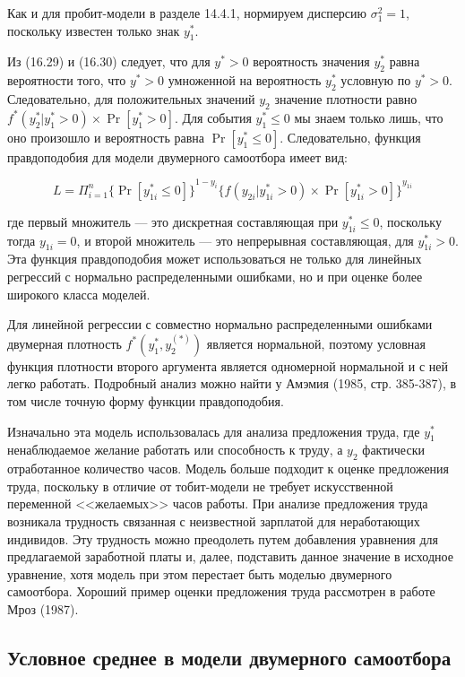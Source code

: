 Как и для пробит-модели в разделе 14.4.1, нормируем дисперсию $\sigma^{2}_1=1$, поскольку известен только знак $y^* _1$. 

Из (16.29) и (16.30) следует, что для  $y^* >0$ вероятность значения $y^* _2$ равна вероятности того, что $y^* >0$ умноженной на вероятность $y^* _2$ условную по $y^* >0$. Следовательно, для положительных значений $y_2$ значение плотности равно $f^{*}(y^* _2|y^* _1>0){\times}\Pr[ y^* _1>0]$. Для события $y^* _{1} \leq 0$ мы знаем только лишь, что оно произошло и вероятность равна $\Pr[ y_{1}^{*} \leq 0]$. Следовательно, функция правдоподобия для модели двумерного самоотбора имеет вид:

\begin{equation}
L=\Pi_{i=1}^n{\lbrace \Pr[ y_{1i}^{*} \leq 0]\rbrace}^{1-y_i}{\lbrace f(y_{2i}|y_{1i}^{*}>0){\times}\Pr[ y_{1i}^{*}>0]\rbrace}^{y_{1i}}
\end{equation}

где первый множитель --- это дискретная составляющая при $y^* _{1i} \leq 0$, поскольку тогда $y_{1i}=0$, и второй множитель --- это непрерывная составляющая, для $y^* _{1i}>0$. Эта функция правдоподобия может использоваться не только для линейных регрессий с нормально распределенными ошибками, но и при оценке более широкого класса моделей.

Для линейной регрессии с совместно  нормально распределенными ошибками двумерная плотность  $f^{*}(y^* _1,y^(*)_2)$ является нормальной, поэтому условная функция плотности второго аргумента является одномерной нормальной и с ней легко работать. Подробный анализ можно найти у Амэмия (1985, стр. 385-387), в том числе точную форму функции правдоподобия. 

Изначально эта модель использовалась для анализа предложения труда, где $y^* _1$ ненаблюдаемое желание работать или способность к труду, а $y_2$ фактически отработанное количество часов. Модель больше подходит к оценке предложения труда, поскольку в отличие от тобит-модели не требует искусственной переменной <<желаемых>> часов работы. При анализе предложения труда возникала трудность связанная с неизвестной зарплатой для неработающих индивидов.
Эту трудность можно преодолеть путем добавления уравнения для предлагаемой заработной платы и, далее, подставить данное значение в исходное уравнение, хотя модель при этом перестает быть моделью двумерного самоотбора. Хороший пример оценки предложения труда рассмотрен в работе Мроз (1987).

\subsection{Условное среднее в модели двумерного самоотбора}

